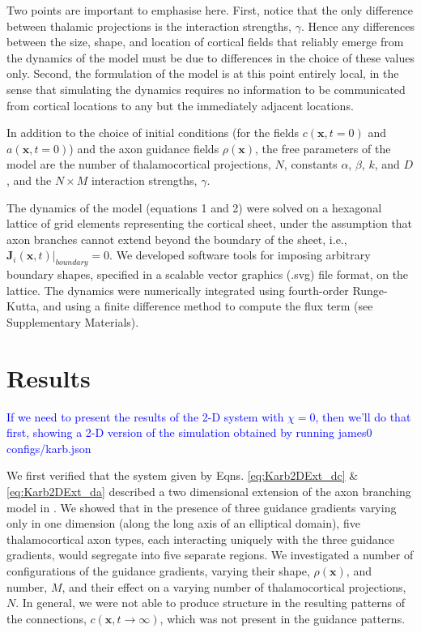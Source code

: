 \documentclass[a4paper,11pt]{article}
\newcommand{\cmnt}[1]{\textcolor{blue}{#1}}
\newcommand{\code}[1]{\textsf{#1}}
\newcommand{\mb}[1]{\mathbf{#1}}
\begin{document}
Two points are important to emphasise here. First, notice that the only
difference between thalamic projections is the interaction strengths,
$\gamma$. Hence any differences between the size, shape, and location of
cortical fields that reliably emerge from the dynamics of the model must be
due to differences in the choice of these values only. Second, the formulation
of the model is at this point entirely local, in the sense that simulating the
dynamics requires no information to be communicated from cortical locations to
any but the immediately adjacent locations.

In addition to the choice of initial conditions (for the fields
$c(\mb{x},t=0)$ and $a(\mb{x},t=0)$) and the axon guidance fields
$\rho(\mb{x})$, the free parameters of the model are the number of
thalamocortical projections, $N$, constants $\alpha$, $\beta$, $k$, and $D$,
and the $N\times M$ interaction strengths, $\gamma$.

The dynamics of the model (equations 1 and 2) were solved on a hexagonal
lattice of grid elements representing the cortical sheet, under the assumption
that axon branches cannot extend beyond the boundary of the sheet, i.e.,
$\mb{J}_i(\mb{x},t) \bigg\rvert_{boundary} = 0$. We developed software tools
for imposing arbitrary boundary shapes, specified in a scalable vector
graphics (.svg) file format, on the lattice. The dynamics were numerically
integrated using fourth-order Runge-Kutta, and using a {\color{red} finite
  difference method} to compute the flux term (see Supplementary Materials).



\section*{Results}

\cmnt{If we need to present the results of the 2-D system with $\chi=0$, then
  we'll do that first, showing a 2-D version of the simulation obtained by
  running \code{james0 configs/karb.json}}

We first verified that the system given by Eqns. \ref{eq:Karb2DExt_dc} \&
\ref{eq:Karb2DExt_da} described a two dimensional extension of the axon
branching model in \citet{Karbowski2004}. We showed that in the presence of
three guidance gradients varying only in one dimension (along the long axis of
an elliptical domain), five thalamocortical axon types, each interacting
uniquely with the three guidance gradients, would segregate into five separate
regions. We investigated a number of configurations of the guidance gradients,
varying their shape, $\rho(\mb{x})$, and number, $M$, and their effect on a
varying number of thalamocortical projections, $N$. In general, we were not
able to produce structure in the resulting patterns of the connections,
$c(\mb{x},t\rightarrow\infty)$, which was not present in the guidance
patterns.
\end{document}
